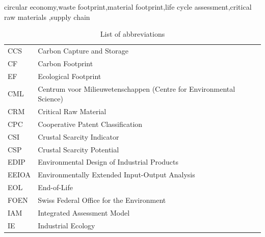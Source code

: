 \documentclass[a4paper,fleqn]{cas-dc}
\begin{document}

\begin{keywords}
circular economy\sep waste footprint\sep material footprint\sep life cycle assessment\sep critical raw materials \sep supply chain
\end{keywords}

\maketitle

\begin{table}[!htbp]
	\centering
	\caption{List of abbreviations}\label{tab:abbreviations}
	\begin{tabular}{ll}
		\toprule
		CCS	              & Carbon Capture and Storage                                          \\
		CF                & Carbon Footprint                                                    \\
		EF                & Ecological Footprint                                                \\
		CML               & Centrum voor Milieuwetenschappen (Centre for Environmental Science) \\
		CRM               & Critical Raw Material                                               \\
		CPC               & Cooperative Patent Classification                                   \\
		CSI               & Crustal Scarcity Indicator                                          \\
		CSP               & Crustal Scarcity Potential                                          \\
		EDIP              & Environmental Design of Industrial Products                         \\
		EEIOA             & Environmentally Extended Input-Output Analysis                      \\
		EOL               & End-of-Life                                                         \\
		FOEN              & Swiss Federal Office for the Environment                            \\
		IAM               & Integrated Assessment Model                                         \\
		IE                & Industrial Ecology                                                  \\

\end{tabular}
\end{table}
\end{document}
